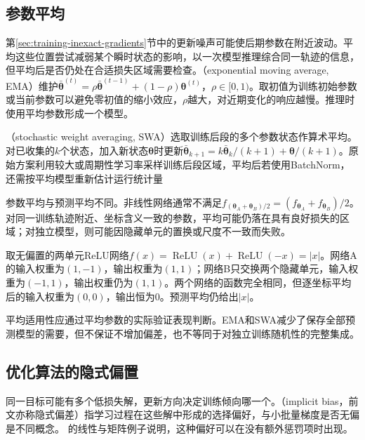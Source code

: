 \subsection{参数平均}
\label{sec:generalization-weight-averaging}

第\ref{sec:training-inexact-gradients}节中的更新噪声可能使后期参数在附近波动。平均这些位置尝试减弱某个瞬时状态的影响，以一次模型推理综合同一轨迹的信息，但平均后是否仍处在合适损失区域需要检查。（exponential moving average, EMA）维护$\bar{\bm\theta}^{(t)}=\rho\bar{\bm\theta}^{(t-1)}+(1-\rho)\bm\theta^{(t)}$，$\rho\in[0,1)$。取初值为训练初始参数或当前参数可以避免零初值的缩小效应，$\rho$越大，对近期变化的响应越慢。推理时使用平均参数形成一个模型。

（stochastic weight averaging, SWA）选取训练后段的多个参数状态作算术平均。对已收集的$k$个状态，加入新状态$\bm\theta$时更新$\bar{\bm\theta}_{k+1}=k\bar{\bm\theta}_k/(k+1)+\bm\theta/(k+1)$。原始方案利用较大或周期性学习率采样训练后段区域，平均后若使用BatchNorm，还需按平均模型重新估计运行统计量

参数平均与预测平均不同。非线性网络通常不满足$f_{(\bm\theta_A+\bm\theta_B)/2}=(f_{\bm\theta_A}+f_{\bm\theta_B})/2$。对同一训练轨迹附近、坐标含义一致的参数，平均可能仍落在具有良好损失的区域；对独立模型，则可能因隐藏单元的置换或尺度不一致而失败。

\begin{example}[等价网络的参数平均可以失效]
  \label{ex:generalization-parameter-average}
  取无偏置的两单元ReLU网络$f(x)=\operatorname{ReLU}(x)+\operatorname{ReLU}(-x)=|x|$。网络A的输入权重为$(1,-1)$，输出权重为$(1,1)$；网络B只交换两个隐藏单元，输入权重为$(-1,1)$，输出权重仍为$(1,1)$。两个网络的函数完全相同，但逐坐标平均后的输入权重为$(0,0)$，输出恒为0。预测平均仍给出$|x|$。
\end{example}

平均适用性应通过平均参数的实际验证表现判断。EMA和SWA减少了保存全部预测模型的需要，但不保证不增加偏差，也不等同于对独立训练随机性的完整集成。

\subsection{优化算法的隐式偏置}
\label{sec:generalization-implicit-bias}

同一目标可能有多个低损失解，更新方向决定训练倾向哪一个。（implicit bias，前文亦称隐式偏差）指学习过程在这些解中形成的选择偏好，与小批量梯度是否无偏是不同概念。
的线性与矩阵例子说明，这种偏好可以在没有额外惩罚项时出现。


